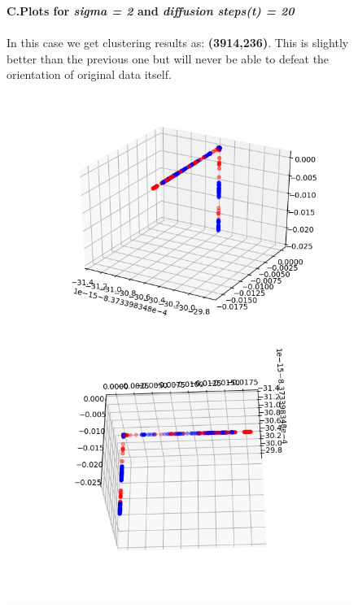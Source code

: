 \documentclass[12pt]{scrartcl}
\begin{document}
\begin{figure}[h]
\textbf{C.\quad Plots for \textit{sigma = 2} and \textit{diffusion steps(t) = 20}}
\\\\
In this case we get clustering results as: \textbf{(3914,236)}. This is slightly better than the previous one but will never be able to defeat the orientation of original data itself.\\
		
    		\includegraphics[scale=0.5]{2_20_.png}
    		\includegraphics[scale=0.5]{2_20__.png}
    		
\end{figure}
\end{document}
